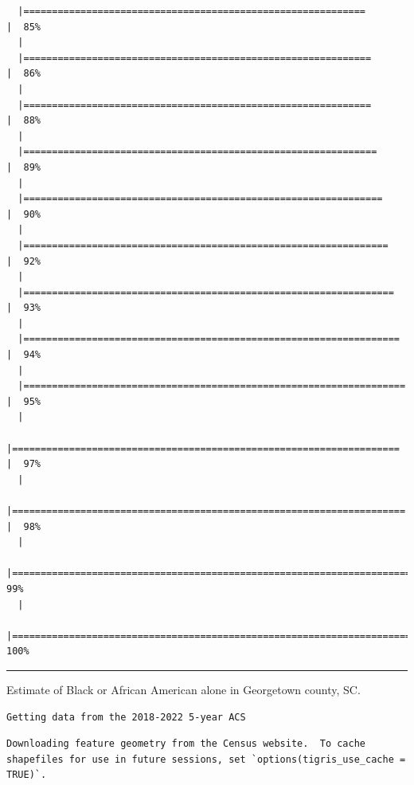 \documentclass[
  letterpaper,
  DIV=11,
  numbers=noendperiod]{scrartcl}
\begin{document}
\begin{verbatim}
  |============================================================          |  85%
  |                                                                            
  |=============================================================         |  86%
  |                                                                            
  |=============================================================         |  88%
  |                                                                            
  |==============================================================        |  89%
  |                                                                            
  |===============================================================       |  90%
  |                                                                            
  |================================================================      |  92%
  |                                                                            
  |=================================================================     |  93%
  |                                                                            
  |==================================================================    |  94%
  |                                                                            
  |===================================================================   |  95%
  |                                                                            
  |====================================================================  |  97%
  |                                                                            
  |===================================================================== |  98%
  |                                                                            
  |======================================================================|  99%
  |                                                                            
  |======================================================================| 100%
\end{verbatim}

\begin{center}\rule{0.5\linewidth}{0.5pt}\end{center}

Estimate of Black or African American alone in Georgetown county, SC.

\begin{verbatim}
Getting data from the 2018-2022 5-year ACS
\end{verbatim}

\begin{verbatim}
Downloading feature geometry from the Census website.  To cache shapefiles for use in future sessions, set `options(tigris_use_cache = TRUE)`.
\end{verbatim}
\end{document}
